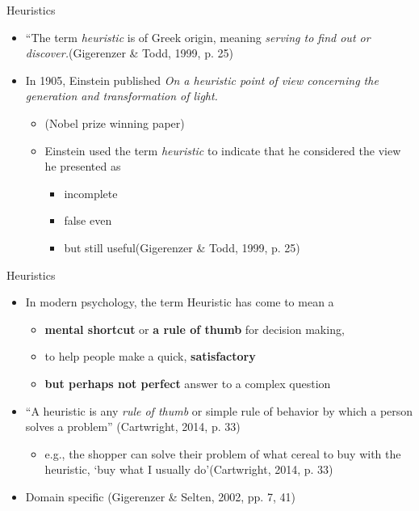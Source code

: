 \documentclass[
  ignorenonframetext,
]{beamer}
\providecommand{\tightlist}{%
  \setlength{\itemsep}{0pt}\setlength{\parskip}{0pt}}\usepackage{longtable,booktabs,array}
\begin{document}
\begin{frame}{Heuristics}
\protect\hypertarget{heuristics-1}{}
\begin{itemize}
\item
  ``The term \emph{heuristic} is of Greek origin, meaning \emph{serving
  to find out or discover.}(Gigerenzer \& Todd, 1999, p. 25)
\item
  In 1905, Einstein published \emph{On a heuristic point of view
  concerning the generation and transformation of light.}

  \begin{itemize}
  \tightlist
  \item
    (Nobel prize winning paper)
  \item
    Einstein used the term \emph{heuristic} to indicate that he
    considered the view he presented as

    \begin{itemize}
    \tightlist
    \item
      incomplete
    \item
      false even
    \item
      but still useful(Gigerenzer \& Todd, 1999, p. 25)
    \end{itemize}
  \end{itemize}
\end{itemize}
\end{frame}

\begin{frame}{Heuristics}
\protect\hypertarget{heuristics-2}{}
\begin{itemize}
\tightlist
\item
  In modern psychology, the term Heuristic has come to mean a

  \begin{itemize}
  \tightlist
  \item
    \textbf{mental shortcut} or \textbf{a rule of thumb} for decision
    making,
  \item
    to help people make a quick, \textbf{satisfactory}
  \item
    \textbf{but perhaps not perfect} answer to a complex question
  \end{itemize}
\item
  ``A heuristic is any \emph{rule of thumb} or simple rule of behavior
  by which a person solves a problem'' (Cartwright, 2014, p. 33)

  \begin{itemize}
  \tightlist
  \item
    e.g., the shopper can solve their problem of what cereal to buy with
    the heuristic, `buy what I usually do'(Cartwright, 2014, p. 33)
  \end{itemize}
\item
  Domain specific (Gigerenzer \& Selten, 2002, pp. 7, 41)
\end{itemize}
\end{frame}
\end{document}
